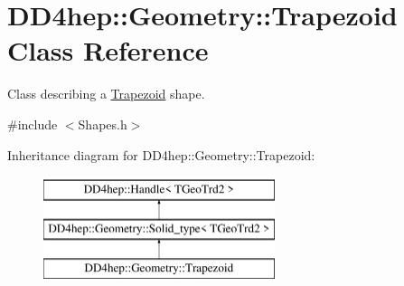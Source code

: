 \hypertarget{class_d_d4hep_1_1_geometry_1_1_trapezoid}{}\section{D\+D4hep\+:\+:Geometry\+:\+:Trapezoid Class Reference}
\label{class_d_d4hep_1_1_geometry_1_1_trapezoid}


Class describing a \hyperlink{class_d_d4hep_1_1_geometry_1_1_trapezoid}{Trapezoid} shape.  




{\ttfamily \#include $<$Shapes.\+h$>$}

Inheritance diagram for D\+D4hep\+:\+:Geometry\+:\+:Trapezoid\+:\begin{figure}[H]
\begin{center}
\leavevmode
\includegraphics[height=3.000000cm]{class_d_d4hep_1_1_geometry_1_1_trapezoid}
\end{center}
\end{figure}
